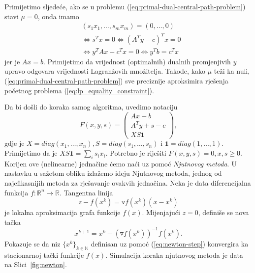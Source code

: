 \documentclass[a4paper, utf8, 11pt, colorlinks]{article}
\begin{document}
Primijetimo sljedeće, ako se u problemu (\ref{eq:primal-dual-central-path-problem}) stavi $\mu = 0$, onda imamo 
\begin{align*}
	&(s_1 x_1, \ldots, s_m x_m) = (0, \ldots, 0) \\
	&\Longleftrightarrow s^T x = 0  \Longleftrightarrow (A^T y - c)^T x = 0 \\
	&\Longleftrightarrow y^T A x - c^T x = 0 \Longleftrightarrow y^T b = c^Tx
\end{align*}
jer je $Ax = b$. Primijetimo da   vrijednost (optimalnih) dualnih promjenjivih $y$ upravo odgovara vrijednosti Lagranžovih množitelja. Takođe, kako $\mu$ teži ka nuli,   (\ref{eq:primal-dual-central-path-problem}) sve preciznije aproksimira rješenja početnog problema (\ref{eq:lp_equality_constraint}). 

Da bi došli do koraka samog algoritma, uvedimo notaciju 
$$ F(x, y, s) = \left (\begin{array}{c}
	Ax - b           \\
	A^T y + s - c     \\
	X S \textbf{1}                   
\end{array} \right ),$$
gdje je  $X = diag (x_1, \ldots, x_n ), S = diag(s_1,\ldots, s_n)$ i 
$\textbf{1} = diag (1,\ldots, 1)$. Primijetimo da je $X S \textbf{1}=\sum_{i} s_i x_i$. 
Potrebno je riješiti $F(x, y, s ) = 0, x,s \geq 0$. Korijen ove (nelinearne) jednačine ćemo naći uz pomoć \emph{Njutnovog metoda}. U nastavku u sažetom obliku izlažemo ideju Njutnovog metoda, jednog od najefikasnijih metoda za rješavanje ovakvih jednačina. Neka je data diferencijalna funkcija $f: \mathbb{R}^n \mapsto \mathbb{R}$.   Tangentna linija 
$$z - f(x^k) = \triangledown f(x^k) (x - x^k) $$
je lokalna aproksimacija grafa funkcije $f(x)$. Mijenjajući $z=0$, definiše se nova tačka 
\begin{equation} \label{eq:newton-step}
	x^{k+1} = x^k - (\triangledown f(x^k))^{-1} f(x^k).
\end{equation}
Pokazuje se da niz $\{x^k\}_{k \in \mathbb{N}}$ definisan uz pomoć (\ref{eq:newton-step}) konvergira ka stacionarnoj tački funkcije $f(x)$. Simulacija koraka njutnovog metoda je data na Slici~\ref{fig:newton}. 
\end{document}
